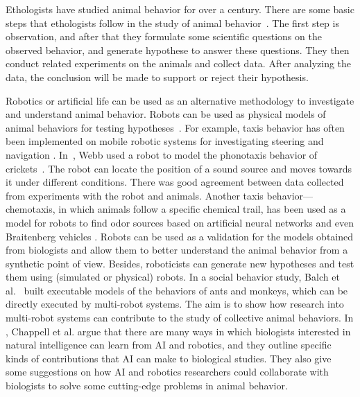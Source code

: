 Ethologists have studied animal behavior for over a century. There are some basic steps that ethologists follow in the study of animal behavior~\cite{camazine2003self}. The first step is observation, and after that they formulate some scientific questions on the observed behavior, and generate hypothese to answer these questions. They then conduct related experiments on the animals and collect data. After analyzing the data, the conclusion will be made to support or reject their hypothesis.

Robotics or artificial life can be used as an alternative methodology to investigate and understand animal behavior. Robots can be used as physical models of animal behaviors for testing hypotheses~\citep{Barbara_2000, Meyer2008}. For example, taxis behavior has often been implemented on mobile robotic systems for investigating steering and navigation \cite{Ignacio2009}. In~\citep{Barbara_1995}, Webb used a robot to model the phonotaxis behavior of crickets~\citep{Popov:JCP:1997}. The robot can locate the position of a sound source and moves towards it under different conditions. There was good agreement between data collected from experiments with the robot and animals. Another taxis behavior---chemotaxis, in which animals follow a specific chemical trail, has been used as a model for robots to find odor sources based on artificial neural networks \cite{Farah_2002} and even Braitenberg vehicles \cite{Lilienthal_2003}. Robots can be used as a validation for the models obtained from biologists and allow them to better understand the animal behavior from a synthetic point of view. Besides, roboticists can generate new hypotheses and test them using (simulated or physical) robots. In a social behavior study, Balch et al.~\citep{Balch_2006} built executable models of the behaviors of ants and monkeys, which can be directly executed by multi-robot systems. The aim is to show how research into multi-robot systems can contribute to the study of collective animal behaviors. In \cite{Chappell_2010}, Chappell et al. argue that there are many ways in which biologists interested in natural intelligence can learn from AI and robotics, and they outline specific kinds of contributions that AI can make to biological studies. They also give some suggestions on how AI and robotics researchers could collaborate with biologists to solve some cutting-edge problems in animal behavior.


